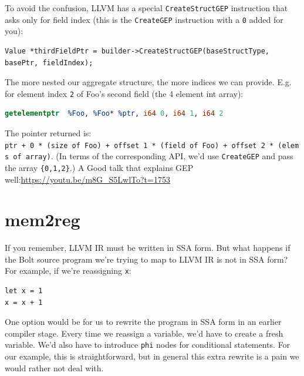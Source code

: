 To avoid the confusion, LLVM has a special \texttt{CreateStructGEP}
instruction that asks only for field index (this is the
\texttt{CreateGEP} instruction with a \texttt{0} added for you):


\begin{verbatim}
Value *thirdFieldPtr = builder->CreateStructGEP(baseStructType, basePtr, fieldIndex);
\end{verbatim}

The more nested our aggregate structure, the more indices we can
provide. E.g. for element index \texttt{2} of Foo's second field (the 4
element int array):


\begin{lstlisting}[language=llvm]
getelementptr  %Foo, %Foo* %ptr, i64 0, i64 1, i64 2
\end{lstlisting}

The pointer returned is:
\texttt{ptr\ +\ 0\ *\ (size\ of\ Foo)\ +\ offset\ 1\ *\ (field\ of\ Foo)\ +\ offset\ 2\ *\ (elems\ of\ array)}.
(In terms of the corresponding API, we'd use \texttt{CreateGEP} and pass
the array \texttt{\{0,1,2\}}.)
{A Good talk that explains GEP
well:\url{https://youtu.be/m8G_S5LwlTo?t=1753}}

\hypertarget{mem2reg}{%
\section{\texorpdfstring{\protect\hyperlink{mem2reg}{}mem2reg}{mem2reg}}\label{mem2reg}}

If you remember, LLVM IR must be written in SSA form. But what happens
if the Bolt source program we're trying to map to LLVM IR is not in SSA
form? For example, if we're reassigning \texttt{x}:



\begin{verbatim}
let x = 1
x = x + 1
\end{verbatim}

One option would be for us to rewrite the program in SSA form in an
earlier compiler stage. Every time we reassign a variable, we'd have to
create a fresh variable. We'd also have to introduce \texttt{phi} nodes
for conditional statements. For our example, this is straightforward,
but in general this extra rewrite is a pain we would rather not deal
with.

